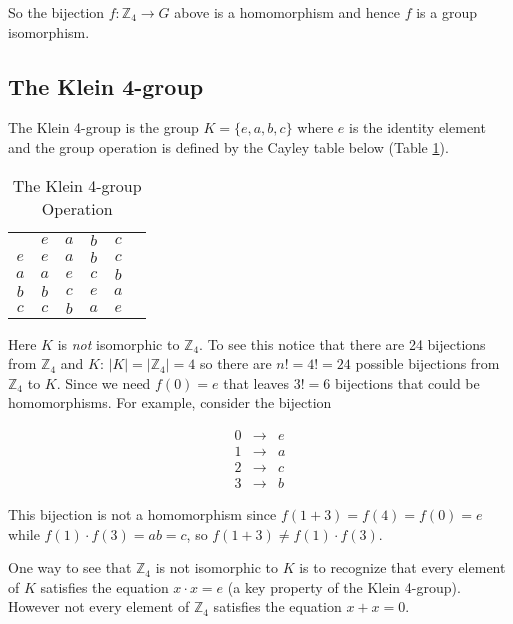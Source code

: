 \documentclass{article}
\theoremstyle{definition}
\begin{document}
\bigskip
\noindent
So the bijection $f: \mathbb{Z}_4 \rightarrow G$ above is a
homomorphism and hence $f$ is a group isomorphism. 


\subsection{The Klein 4-group}
\label{subsub:klein}

The Klein 4-group is the group $K = \{e,a,b,c\}$ where $e$ is the
identity element and the group operation is defined by the Cayley
table below (Table \ref{tab:klein}).

\bigskip
\begin{table}[H]
\centering
\begin{tabular}{c | c c c c c} 
& $e$ & $a$ & $b$ & $c$ \\
\cline{1-5}
$e$ & $e$ & $a$ & $b$ & $c$ \\
$a$ & $a$ & $e$ & $c$ & $b$ \\
$b$ & $b$ & $c$ & $e$ & $a$ \\
$c$ & $c$ & $b$ & $a$ & $e$
\end{tabular}
\caption{The Klein 4-group Operation} 
\label{tab:klein}
\end{table}

\bigskip
\noindent
Here $K$ is \emph{not} isomorphic to $\mathbb{Z}_{4}$. To see
this notice that there are 24 bijections from $\mathbb{Z}_4$ and
$K$: $|K| = |\mathbb{Z}_4| = 4$ so there are $n! = 4! = 24$
possible bijections from $\mathbb{Z}_4$ to $K$. Since we need
$f(0) = e$ that leaves $3! = 6$ bijections that could be
homomorphisms.  For example, consider the bijection

\begin{equation*}
\begin{array}{ccr}
0 &\longrightarrow&  e \\
1 &\longrightarrow&  a \\
2 &\longrightarrow&  c \\
3 &\longrightarrow&  b 
\end{array}
\end{equation*}

\bigskip
\noindent
This bijection is not a homomorphism since $f(1+3) = f(4) = f(0)
= e$ while $f(1) \cdot f(3) = ab = c$, so $f(1+3) \neq f(1) \cdot
f(3)$.

\bigskip
\noindent
One way to see that $\mathbb{Z}_4$ is not isomorphic to $K$ is to
recognize that every element of $K$ satisfies the equation $x
\cdot x =e$ (a key property of the Klein 4-group). However not
every element of $\mathbb{Z}_4$ satisfies the equation $x + x =
0$.
\end{document}

